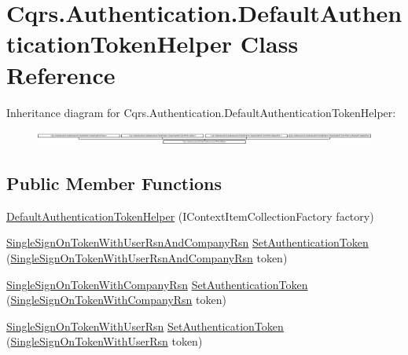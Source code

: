\hypertarget{classCqrs_1_1Authentication_1_1DefaultAuthenticationTokenHelper}{}\section{Cqrs.\+Authentication.\+Default\+Authentication\+Token\+Helper Class Reference}
\label{classCqrs_1_1Authentication_1_1DefaultAuthenticationTokenHelper}
Inheritance diagram for Cqrs.\+Authentication.\+Default\+Authentication\+Token\+Helper\+:\begin{figure}[H]
\begin{center}
\leavevmode
\includegraphics[height=0.472973cm]{classCqrs_1_1Authentication_1_1DefaultAuthenticationTokenHelper}
\end{center}
\end{figure}
\subsection*{Public Member Functions}
\begin{DoxyCompactItemize}
\item 
\hyperlink{classCqrs_1_1Authentication_1_1DefaultAuthenticationTokenHelper_a21bfae37d24b180797211396a0348526}{Default\+Authentication\+Token\+Helper} (I\+Context\+Item\+Collection\+Factory factory)
\item 
\hyperlink{classCqrs_1_1Authentication_1_1SingleSignOnTokenWithUserRsnAndCompanyRsn}{Single\+Sign\+On\+Token\+With\+User\+Rsn\+And\+Company\+Rsn} \hyperlink{classCqrs_1_1Authentication_1_1DefaultAuthenticationTokenHelper_ab06712f60b8afc6819b5372e3a21e13a}{Set\+Authentication\+Token} (\hyperlink{classCqrs_1_1Authentication_1_1SingleSignOnTokenWithUserRsnAndCompanyRsn}{Single\+Sign\+On\+Token\+With\+User\+Rsn\+And\+Company\+Rsn} token)
\item 
\hyperlink{classCqrs_1_1Authentication_1_1SingleSignOnTokenWithCompanyRsn}{Single\+Sign\+On\+Token\+With\+Company\+Rsn} \hyperlink{classCqrs_1_1Authentication_1_1DefaultAuthenticationTokenHelper_a2ae21fb09555d3ab5119f9ea4c69b202}{Set\+Authentication\+Token} (\hyperlink{classCqrs_1_1Authentication_1_1SingleSignOnTokenWithCompanyRsn}{Single\+Sign\+On\+Token\+With\+Company\+Rsn} token)
\item 
\hyperlink{classCqrs_1_1Authentication_1_1SingleSignOnTokenWithUserRsn}{Single\+Sign\+On\+Token\+With\+User\+Rsn} \hyperlink{classCqrs_1_1Authentication_1_1DefaultAuthenticationTokenHelper_a57d015883b278136590894a3885d246c}{Set\+Authentication\+Token} (\hyperlink{classCqrs_1_1Authentication_1_1SingleSignOnTokenWithUserRsn}{Single\+Sign\+On\+Token\+With\+User\+Rsn} token)
\end{DoxyCompactItemize}


